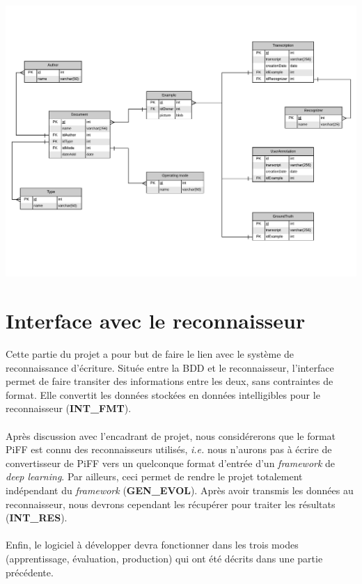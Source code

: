 \newpage

\begin{mdframed}[frametitle={Figure 6 : Modèle entité association de la base de données}, innerbottommargin=10]
\begin{center}
\includegraphics[width=\linewidth]{Modele_entite_association.pdf}
\end{center}
\end{mdframed}

\section{Interface avec le reconnaisseur}

Cette partie du projet a pour but de faire le lien avec le système de
reconnaissance d’écriture. Située entre la BDD et le reconnaisseur,
l’interface permet de faire transiter des informations entre les deux, sans
contraintes de format. Elle convertit les données stockées en données
intelligibles pour le reconnaisseur (\textbf{INT\_FMT}).

\paragraph{}
Après discussion avec l'encadrant de projet, nous considérerons que le format
PiFF est connu des reconnaisseurs utilisés, \textit{i.e.} nous n'aurons pas à
écrire de convertisseur de PiFF vers un quelconque format d'entrée d'un
\textit{framework} de \textit{deep learning}. Par ailleurs, ceci permet de
rendre le projet totalement indépendant du \textit{framework}
(\textbf{GEN\_EVOL}). Après avoir transmis les données au reconnaisseur, nous
devrons cependant les récupérer pour traiter les résultats (\textbf{INT\_RES}).

\paragraph{}
Enfin, le logiciel à développer devra fonctionner dans les trois modes
(apprentissage, évaluation, production) qui ont été décrits dans une partie
précédente.